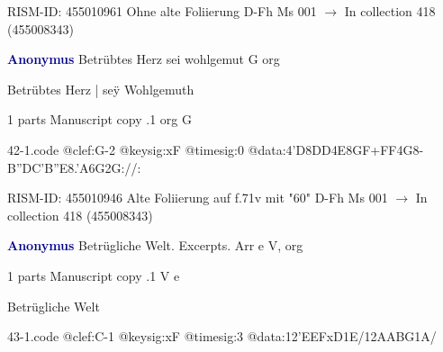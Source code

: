 \documentclass[twocolumn]{book}
\begin{document}
\newline RISM-ID: 455010961
\newline Ohne alte Foliierung
\newline D-Fh  Ms 001
\newline $\rightarrow$ In collection 418 (455008343)

\newline \par \vspace{7pt} \textcolor{darkblue}{\textbf{Anonymus  }}
\newline Betrübtes Herz sei wohlgemut  G  
\newline org
\newline \begin{itshape}[f.71v, at left:] Betrübtes Herz | seÿ Wohlgemuth\end{itshape} 
\newline \textcolor{darkblue}{}  1 parts  
\newline Manuscript copy
.1  org  G  
\begin{filecontents*}{42-1.code}
@clef:G-2
@keysig:xF
@timesig:0
@data:4'D{8DD}4E{8GF+}{FF}4G8-{B''DC}{'B''E8.'A6G}2G://:
\end{filecontents*}
\newline
%

\newline RISM-ID: 455010946
\newline Alte Foliierung auf f.71v mit "60"
\newline D-Fh  Ms 001
\newline $\rightarrow$ In collection 418 (455008343)

\newline \par \vspace{7pt} \textcolor{darkblue}{\textbf{Anonymus  }}
\newline Betrügliche Welt. Excerpts. Arr  e  
\newline V, org
\newline \begin{itshape}\end{itshape} 
\newline \textcolor{darkblue}{}  1 parts  
\newline Manuscript copy
.1  V  e
\newline \begin{footnotesize} Betrügliche Welt \end{footnotesize}  
\begin{filecontents*}{43-1.code}
@clef:C-1
@keysig:xF
@timesig:3
@data:12'EEFxD1E/12AABG1A/
\end{filecontents*}
\newline
%
\end{document}
